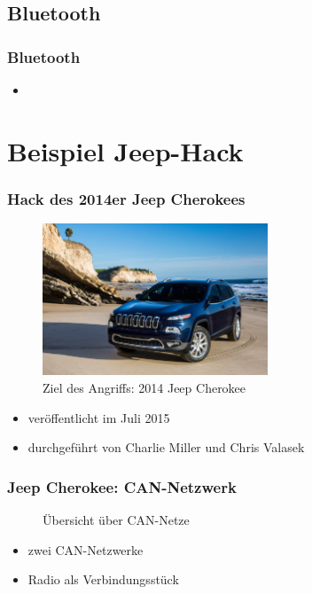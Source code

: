 \documentclass[t]{beamer}
\begin{document}
 \begin{frame}
	\frametitle{WLAN III}
    }]{wlan-pwd.c}

\end{frame}

\subsection{Bluetooth} %

\begin{frame}
	\frametitle{Bluetooth}
    \begin{itemize}
		\item
    \end{itemize}
\end{frame}

\section{Beispiel Jeep-Hack}
\begin{frame}
	\frametitle{Hack des 2014er Jeep Cherokees}
	\begin{figure}
        \includegraphics[width=0.6\textwidth]{pic/2014-jeep-cherokee-1.jpg} %
        \caption{Ziel des Angriffs: 2014 Jeep Cherokee}
    \end{figure}
    \begin{itemize}
		\item veröffentlicht im Juli 2015
        \item durchgeführt von Charlie Miller und Chris Valasek
	\end{itemize}
\end{frame}

\begin{frame}
	\frametitle{Jeep Cherokee: CAN-Netzwerk}
    \begin{figure}
        \caption{Übersicht über CAN-Netze}
	\end{figure}
    \begin{itemize}
		\item zwei CAN-Netzwerke
        \item Radio als Verbindungsstück
	\end{itemize}
\end{frame}
\end{document}

